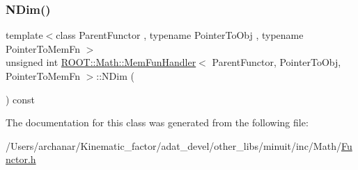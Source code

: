 \subsubsection{\texorpdfstring{NDim()}{NDim()}\hspace{0.1cm}{\footnotesize\ttfamily [2/2]}}
{\footnotesize\ttfamily template$<$class Parent\+Functor , typename Pointer\+To\+Obj , typename Pointer\+To\+Mem\+Fn $>$ \\
unsigned int \mbox{\hyperlink{classROOT_1_1Math_1_1MemFunHandler}{R\+O\+O\+T\+::\+Math\+::\+Mem\+Fun\+Handler}}$<$ Parent\+Functor, Pointer\+To\+Obj, Pointer\+To\+Mem\+Fn $>$\+::N\+Dim (\begin{DoxyParamCaption}{ }\end{DoxyParamCaption}) const\hspace{0.3cm}{\ttfamily [inline]}}



The documentation for this class was generated from the following file\+:\begin{DoxyCompactItemize}
\item 
/\+Users/archanar/\+Kinematic\+\_\+factor/adat\+\_\+devel/other\+\_\+libs/minuit/inc/\+Math/\mbox{\hyperlink{other__libs_2minuit_2inc_2Math_2Functor_8h}{Functor.\+h}}\end{DoxyCompactItemize}

